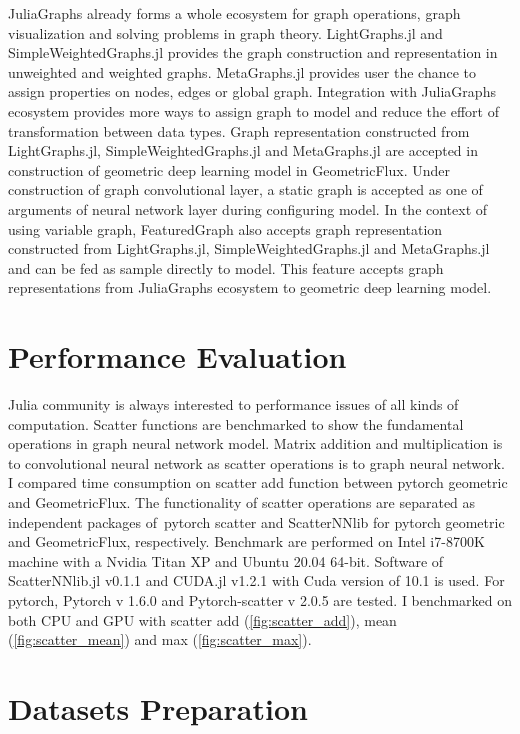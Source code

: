 \documentclass{juliacon}
\begin{document}
JuliaGraphs already forms a whole ecosystem for graph operations, graph visualization and
solving problems in graph theory. LightGraphs.jl and SimpleWeightedGraphs.jl provides the
graph construction and representation in unweighted and weighted graphs.
MetaGraphs.jl provides user the chance to assign properties on nodes, edges or global graph.
Integration with JuliaGraphs ecosystem provides more ways to assign graph to model and
reduce the effort of transformation between data types. Graph representation constructed
from LightGraphs.jl, SimpleWeightedGraphs.jl and MetaGraphs.jl are accepted in construction
of geometric deep learning model in GeometricFlux. Under construction of graph convolutional
layer, a static graph is accepted as one of arguments of neural network layer during
configuring model. In the context of using variable graph, FeaturedGraph also accepts graph
representation constructed from LightGraphs.jl, SimpleWeightedGraphs.jl and MetaGraphs.jl
and can be fed as sample directly to model. This feature accepts graph representations
from JuliaGraphs ecosystem to geometric deep learning model.

\section{Performance Evaluation}

Julia community is always interested to performance issues of all kinds of computation.
Scatter functions are benchmarked to show the fundamental operations in graph neural network
model. Matrix addition and multiplication is to convolutional neural network as scatter
operations is to graph neural network. I compared time consumption on scatter add function
between pytorch geometric and GeometricFlux. The functionality of scatter operations are
separated as independent packages of pytorch scatter and ScatterNNlib for pytorch geometric
and GeometricFlux, respectively. Benchmark are performed on Intel i7-8700K machine with a
Nvidia Titan XP and Ubuntu 20.04 64-bit. Software of ScatterNNlib.jl v0.1.1 and CUDA.jl v1.2.1
with Cuda version of 10.1 is used. For pytorch, Pytorch v 1.6.0 and Pytorch-scatter v 2.0.5
are tested. I benchmarked on both CPU and GPU with scatter add (\autoref{fig:scatter_add}), mean (\autoref{fig:scatter_mean})
and max (\autoref{fig:scatter_max}).

\section{Datasets Preparation}
\end{document}
